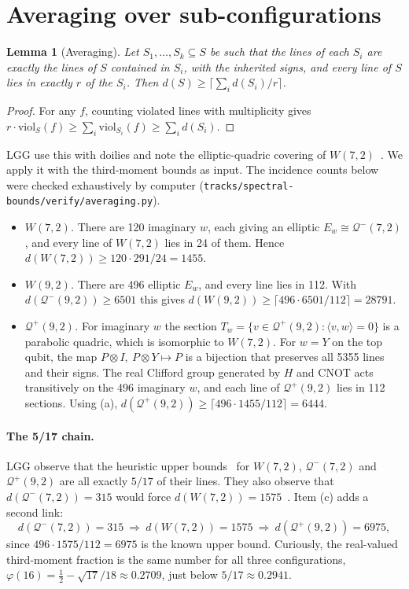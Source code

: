 \documentclass[aps,pra,onecolumn,11pt,superscriptaddress,nofootinbib]{revtex4-2}
\newtheorem{lemma}[theorem]{Lemma}
\theoremstyle{definition}
\theoremstyle{remark}
\newcommand{\Qp}{\mathcal{Q}^{+}}
\newcommand{\Qm}{\mathcal{Q}^{-}}
\begin{document}
\section{Averaging over sub-configurations}

\begin{lemma}[Averaging]\label{lem:avg}
Let $S_1,\dots,S_k\subseteq S$ be such that the lines of each $S_i$ are exactly the lines of
$S$ contained in $S_i$, with the inherited signs, and every line of $S$ lies in exactly $r$ of
the $S_i$. Then $d(S)\ge\lceil\sum_i d(S_i)/r\rceil$.
\end{lemma}
\begin{proof}
For any $f$, counting violated lines with multiplicity gives $r\cdot\mathrm{viol}_S(f)
\ge\sum_i\mathrm{viol}_{S_i}(f)\ge\sum_i d(S_i)$.
\end{proof}

LGG use this with doilies and note the elliptic-quadric covering of $W(7,2)$~\cite{LGG2026}.
We apply it with the third-moment bounds as input. The incidence counts below were checked
exhaustively by computer (\texttt{tracks/spectral-bounds/verify/averaging.py}).

\begin{itemize}
\item[(a)] \emph{$W(7,2)$.} There are 120 imaginary $w$, each giving an elliptic $E_w\cong\Qm(7,2)$,
and every line of $W(7,2)$ lies in 24 of them. Hence $d(W(7,2))\ge120\cdot291/24=1455$.
\item[(b)] \emph{$W(9,2)$.} There are 496 elliptic $E_w$, and every line lies in 112. With
$d(\Qm(9,2))\ge6501$ this gives $d(W(9,2))\ge\lceil496\cdot6501/112\rceil=28791$.
\item[(c)] \emph{$\Qp(9,2)$.} For imaginary $w$ the section
$T_w=\{v\in\Qp(9,2):\langle v,w\rangle=0\}$ is a parabolic quadric, which is isomorphic to
$W(7,2)$. For $w=Y$ on the top qubit, the map $P\otimes I,\ P\otimes Y\mapsto P$ is a
bijection that preserves all 5355 lines and their signs. The real Clifford group generated by
$H$ and CNOT acts transitively on the 496 imaginary $w$, and each line of $\Qp(9,2)$ lies in
112 sections. Using (a), $d(\Qp(9,2))\ge\lceil496\cdot1455/112\rceil=6444$.
\end{itemize}

\paragraph*{The 5/17 chain.}
LGG observe that the heuristic upper bounds~\cite{Muller2025heur} for $W(7,2)$, $\Qm(7,2)$ and
$\Qp(9,2)$ are all exactly $5/17$ of their lines. They also observe that $d(\Qm(7,2))=315$ would
force $d(W(7,2))=1575$~\cite{LGG2026}. Item (c) adds a second link:
\begin{equation}
d(\Qm(7,2))=315\ \Rightarrow\ d(W(7,2))=1575\ \Rightarrow\ d(\Qp(9,2))=6975,
\end{equation}
since $496\cdot1575/112=6975$ is the known upper bound. Curiously, the real-valued third-moment
fraction is the same number for all three configurations, $\varphi(16)=\tfrac12-\sqrt{17}/18\approx0.2709$,
just below $5/17\approx0.2941$.
\end{document}
